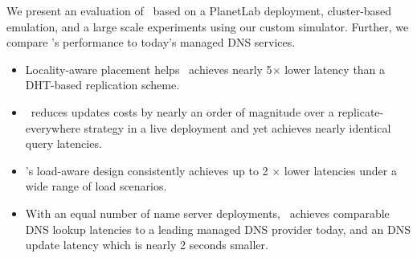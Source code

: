 
We present an evaluation of \auspice\ based on a PlanetLab deployment, cluster-based emulation, and a large scale experiments using our custom simulator. Further, we compare \auspice's performance to today's managed DNS services. 

\begin{itemize}
\item
Locality-aware placement helps \auspice\ achieves nearly 5$\times$ lower latency than a DHT-based replication scheme.
\item
\auspice\ reduces updates costs by nearly an order of magnitude over a replicate-everywhere strategy in a live deployment and yet achieves nearly identical query latencies.
\item
\auspice's load-aware design consistently achieves up to 2 $\times$ lower latencies under a wide range of load scenarios.
\item
With an equal number of name server deployments, \auspice\ achieves comparable DNS lookup latencies to a leading managed DNS provider today, and an DNS update latency which is nearly 2 seconds smaller.
\end{itemize}






